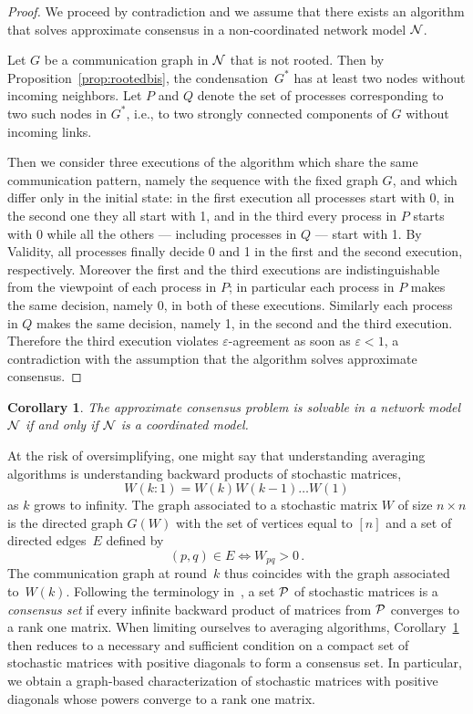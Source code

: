 \documentclass[a4paper]{article}
\theoremstyle{newthm}
\newtheorem{cor}[thm]{Corollary}
\begin{document}
\begin{proof}
 We proceed by contradiction and we assume that there exists an algorithm that solves
	approximate consensus in a non-coordinated network model ${\cal N}$.
	
Let $G$ be a communication graph in  ${\cal N}$ that is not rooted.
Then by Proposition~\ref{prop:rootedbis}, the condensation~$G^*$  has at least two nodes without 
	incoming neighbors.
Let $P$ and $Q$ denote the set of processes  corresponding to two such nodes in $G^*$, i.e., 
	to two strongly connected components of $G$ without incoming links.
	
Then we consider three executions of the algorithm which share the same communication pattern,
	namely the sequence with the fixed graph $G$, and which differ only in the initial state:
	in the first execution all processes start with 0, in the second one they all start with 1, and in 
	the third every  process in $P$ starts with 0 while all the others --- including processes in $Q$ ---
	start with 1.
By Validity, all processes finally decide 0 and 1 in the first and the second execution, respectively.
Moreover the first and the third executions are indistinguishable from the viewpoint of each process in $P$;
	in particular each process in $P$  makes the same decision, namely 0, in both of these executions.
Similarly each process in $Q$  makes the same decision, namely 1, in the second and the third execution.
Therefore the third execution violates $\varepsilon$-agreement as soon as $\varepsilon<1$, a contradiction
	with the assumption that  the algorithm solves approximate consensus.
\end{proof}	

\begin{cor}\label{cor:characterization}
The approximate consensus problem is solvable in a network model ${\cal N}$ if and only if ${\cal N}$ is 
	a coordinated model.
\end{cor}

At the risk of oversimplifying, one might say that understanding averaging algorithms
	is understanding backward products of stochastic matrices,
	$$W(k:1) = W(k)W(k-1)\dots W(1) $$
	as $k$ grows to infinity.
The graph associated to a stochastic matrix $W$ of size $n \times  n$ is the directed graph $G(W)$
	with the set of vertices equal to $[n]$  and a set of directed edges~$E$ defined by 
	$$ (p,q) \in E \Leftrightarrow W_{p q} >0 \, .$$
The  communication graph at round~$k$ thus coincides with the graph associated to~$W(k)$. 
Following the terminology in~\cite{BO13}, a set ${\cal P}$ of stochastic matrices is a {\em consensus set} 
	if every infinite backward product of matrices from ${\cal P}$ converges to a rank one matrix.
When limiting ourselves to averaging algorithms, Corollary~\ref{cor:characterization} then reduces to a
	necessary and sufficient condition on a compact set of stochastic matrices with positive diagonals
	 to form a consensus set.
In particular, we obtain a graph-based characterization of stochastic matrices with positive diagonals 
	whose powers converge to a rank one matrix.
\end{document}
